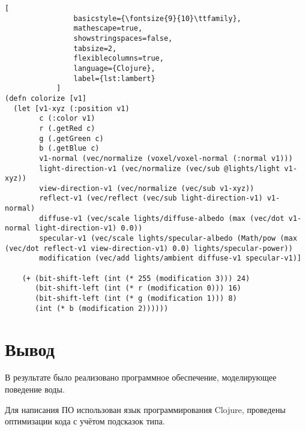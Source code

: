 \begin{lstlisting}[
                basicstyle={\fontsize{9}{10}\ttfamily},
                mathescape=true,
                showstringspaces=false,
                tabsize=2,
                flexiblecolumns=true,
                language={Clojure},
                label={lst:lambert}
            ]
(defn colorize [v1]
  (let [v1-xyz (:position v1)
        c (:color v1)
        r (.getRed c)
        g (.getGreen c)
        b (.getBlue c)
        v1-normal (vec/normalize (voxel/voxel-normal (:normal v1)))
        light-direction-v1 (vec/normalize (vec/sub @lights/light v1-xyz))
        view-direction-v1 (vec/normalize (vec/sub v1-xyz))
        reflect-v1 (vec/reflect (vec/sub light-direction-v1) v1-normal)
        diffuse-v1 (vec/scale lights/diffuse-albedo (max (vec/dot v1-normal light-direction-v1) 0.0))
        specular-v1 (vec/scale lights/specular-albedo (Math/pow (max (vec/dot reflect-v1 view-direction-v1) 0.0) lights/specular-power))
        modification (vec/add lights/ambient diffuse-v1 specular-v1)]

    (+ (bit-shift-left (int (* 255 (modification 3))) 24)
       (bit-shift-left (int (* r (modification 0))) 16)
       (bit-shift-left (int (* g (modification 1))) 8)
       (int (* b (modification 2))))))
\end{lstlisting}

\section{Вывод}

В результате было реализовано программное обеспечение, моделирующее поведение воды.

Для написания ПО использован язык программирования Clojure, проведены оптимизации
кода с учётом подсказок типа.

